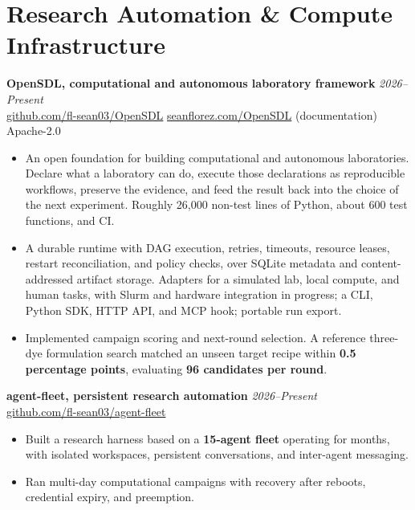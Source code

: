 \documentclass[letterpaper,10pt]{article}
\newcommand{\keep}{\needspace{4\baselineskip}}
\newcommand{\keepsection}{\needspace{6\baselineskip}}
\begin{document}
\keepsection\section*{Research Automation \& Compute Infrastructure}
\textbf{OpenSDL, computational and autonomous laboratory framework} \hfill \textit{2026--Present}\\
\href{https://github.com/fl-sean03/OpenSDL}{github.com/fl-sean03/OpenSDL} \;\textbar\; \href{https://seanflorez.com/OpenSDL/}{seanflorez.com/OpenSDL} (documentation) \;\textbar\; Apache-2.0
\begin{itemize}
    \item An open foundation for building computational and autonomous laboratories. Declare what a laboratory can do, execute those declarations as reproducible workflows, preserve the evidence, and feed the result back into the choice of the next experiment. Roughly 26,000 non-test lines of Python, about 600 test functions, and CI.
    \item A durable runtime with DAG execution, retries, timeouts, resource leases, restart reconciliation, and policy checks, over SQLite metadata and content-addressed artifact storage. Adapters for a simulated lab, local compute, and human tasks, with Slurm and hardware integration in progress; a CLI, Python SDK, HTTP API, and MCP hook; portable run export.
    \item Implemented campaign scoring and next-round selection. A reference three-dye formulation search matched an unseen target recipe within \textbf{0.5 percentage points}, evaluating \textbf{96 candidates per round}.
\end{itemize}

\keep\textbf{agent-fleet, persistent research automation} \hfill \textit{2026--Present}\\
\href{https://github.com/fl-sean03/agent-fleet}{github.com/fl-sean03/agent-fleet}
\begin{itemize}
    \item Built a research harness based on a \textbf{15-agent fleet} operating for months, with isolated workspaces, persistent conversations, and inter-agent messaging.
    \item Ran multi-day computational campaigns with recovery after reboots, credential expiry, and preemption.
\end{itemize}
\end{document}
